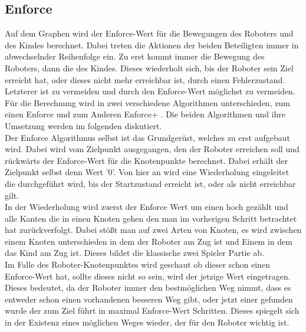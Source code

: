 \subsection{Enforce}
Auf dem Graphen wird der Enforce-Wert für die Bewegungen des Roboters und des Kindes berechnet. Dabei treten die Aktionen der beiden Beteiligten immer in abwechselnder Reihenfolge ein. Zu erst kommt immer die Bewegung des Roboters, dann die des Kindes. Dieses wiederholt sich, bis der Roboter sein Ziel erreicht hat, oder dieses nicht mehr erreichbar ist, durch einen Fehlerzustand. Letzterer ist zu vermeiden und durch den Enforce-Wert möglichst zu vermeiden. \\
Für die Berechnung wird in zwei verschiedene Algorithmen unterschieden, zum einen Enforce und zum Anderen Enforce+ . Die beiden Algorithmen und ihre Umsetzung werden im folgenden diskutiert. \\
Der Enforce Algorithmus selbst ist das Grundgerüst, welches zu erst aufgebaut wird. Dabei wird vom Zielpunkt ausgegangen, den der Roboter erreichen soll und rückwärts der Enforce-Wert für die Knotenpunkte berechnet. Dabei erhält der Zielpunkt selbst denn Wert '0'. Von hier an wird eine Wiederholung eingeleitet die durchgeführt wird, bis der Startzustand erreicht ist, oder als nicht erreichbar gilt. \\
In der Wiederholung wird zuerst der Enforce Wert um einen hoch gezählt und alle Kanten die in einen Knoten gehen den man im vorherigen Schritt betrachtet hat zurückverfolgt. Dabei stößt man auf zwei Arten von Knoten, es wird zwischen einem Knoten unterschieden in dem der Roboter am Zug ist und Einem in dem das Kind am Zug ist. Dieses bildet die klassische zwei Spieler Partie ab. \\
Im Falle des Roboter-Knotenpunktes wird geschaut ob dieser schon einen Enforce-Wert hat, sollte dieses nicht so sein, wird der jetzige Wert eingetragen. Dieses bedeutet, da der Roboter immer den bestmöglichen Weg nimmt, dass es entweder schon einen vorhandenen besseren Weg gibt, oder jetzt einer gefunden wurde der zum Ziel führt in maximal Enforce-Wert Schritten. Dieses spiegelt sich in der Existenz eines möglichen Weges wieder, der für den Roboter wichtig ist. \\
